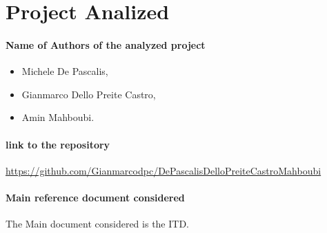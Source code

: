 \chapter{Project Analized}
\subsubsection{Name of Authors of the analyzed project}
\begin{itemize}
\item Michele De Pascalis,  
\item Gianmarco Dello Preite Castro,
\item Amin Mahboubi.
\end{itemize}
\subsubsection{link to the repository}
\url{https://github.com/Gianmarcodpc/DePascalisDelloPreiteCastroMahboubi}
\subsubsection{Main reference document considered}
The Main document considered is the ITD.

